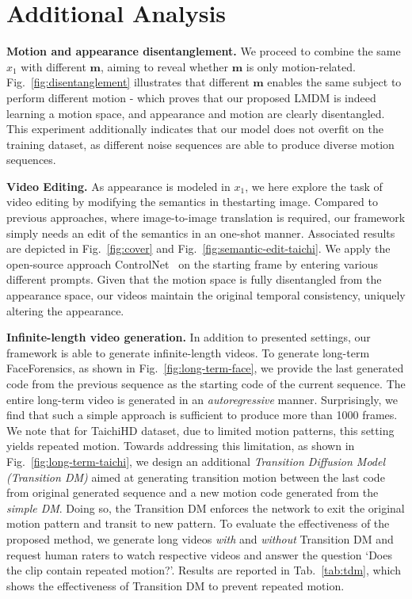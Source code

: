 \section{Additional Analysis}

\textbf{Motion and appearance disentanglement.} We proceed to combine the same $x_1$ with different $\mathbf{m}$, aiming to reveal whether $\mathbf{m}$ is only motion-related. Fig.~\ref{fig:disentanglement} illustrates that different $\mathbf{m}$ enables the same subject to perform different motion - which proves that our proposed LMDM is indeed learning a motion space, and appearance and motion are clearly disentangled. This experiment additionally indicates that our model does not overfit on the training dataset, as different noise sequences are able to produce diverse motion sequences.

\textbf{Video Editing.} As appearance is modeled in $x_1$, we here explore the task of video editing by modifying the semantics in thestarting image. Compared to previous approaches, where image-to-image translation is required, our framework simply needs an edit of the semantics in an one-shot manner. Associated results are depicted in Fig.~\ref{fig:cover} and Fig.~\ref{fig:semantic-edit-taichi}. We apply the open-source approach ControlNet~\cite{controlnet} on the starting frame by entering various different prompts. Given that the motion space is fully disentangled from the appearance space, our videos maintain the original temporal consistency, uniquely altering the appearance. 

\textbf{Infinite-length video generation.}  
In addition to presented settings, our framework is able to generate infinite-length videos. To generate long-term FaceForensics, as shown in Fig.~\ref{fig:long-term-face}, we provide the last generated code from the previous sequence as the starting code of the current sequence. The entire long-term video is generated in an \textit{autoregressive} manner. Surprisingly, we find that such a simple approach is sufficient to produce more than 1000 frames. We note that for TaichiHD dataset, due to limited motion patterns, this setting yields repeated motion. Towards addressing this limitation, as shown in Fig.~\ref{fig:long-term-taichi}, we design an additional \textit{Transition Diffusion Model (Transition DM)} aimed at generating transition motion between the last code from original generated sequence and a new motion code generated from the \textit{simple DM}. Doing so, the Transition DM enforces the network to exit the original motion pattern and transit to new pattern. To evaluate the effectiveness of the proposed method, we generate long videos \textit{with} and \textit{without} Transition DM and request human raters to watch respective videos and answer the question `Does the clip contain repeated motion?'. Results are reported in Tab.~{\ref{tab:tdm}}, which shows the effectiveness of Transition DM to prevent repeated motion.

